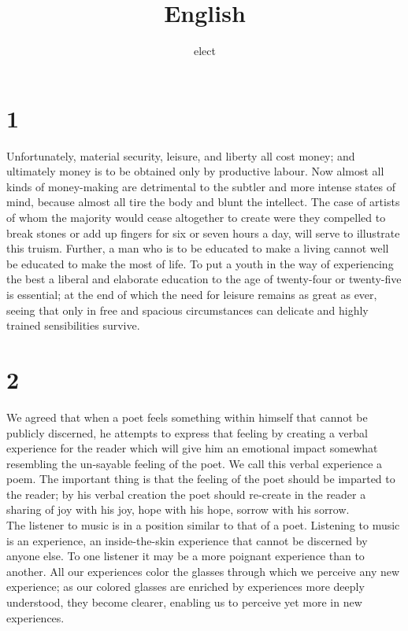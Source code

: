 \documentclass{scrartcl}
\author{elect}
\title{English}
\begin{document}


\section{1}
\label{sec:org905ea82}
Unfortunately, material security, leisure, and liberty all cost money; and ultimately money is to be obtained only by productive labour. Now almost all kinds of money-making are detrimental to the subtler and more intense states of mind, because almost all tire the body and blunt the intellect. The case of artists of whom the majority would cease altogether to create were they compelled to break stones or add up fingers for six or seven hours a day, will serve to illustrate this truism. Further, a man who is to be educated to make a living cannot well be educated to make the most of life. To put a youth in the way of experiencing the best a liberal and elaborate education to the age of twenty-four or twenty-five is essential; at the end of which the need for leisure remains as great as ever, seeing that only in free and spacious circumstances can delicate and highly trained sensibilities survive.\\


\section{2}
\label{sec:orgf423838}
We agreed that when a poet feels something within himself that cannot be publicly discerned, he attempts to express that feeling by creating a verbal experience for the reader which will give him an emotional impact somewhat resembling the un-sayable feeling of the poet. We call this verbal experience a poem. The important thing is that the feeling of the poet should be imparted to the reader; by his verbal creation the poet should re-create in the reader a sharing of joy with his joy, hope with his hope, sorrow with his sorrow.\\
The listener to music is in a position similar to that of a poet. Listening to music is an experience, an inside-the-skin experience that cannot be discerned by anyone else. To one listener it may be a more poignant experience than to another. All our experiences color the glasses through which we perceive any new experience; as our colored glasses are enriched by experiences more deeply understood, they become clearer, enabling us to perceive yet more in new experiences.\\
\end{document}
